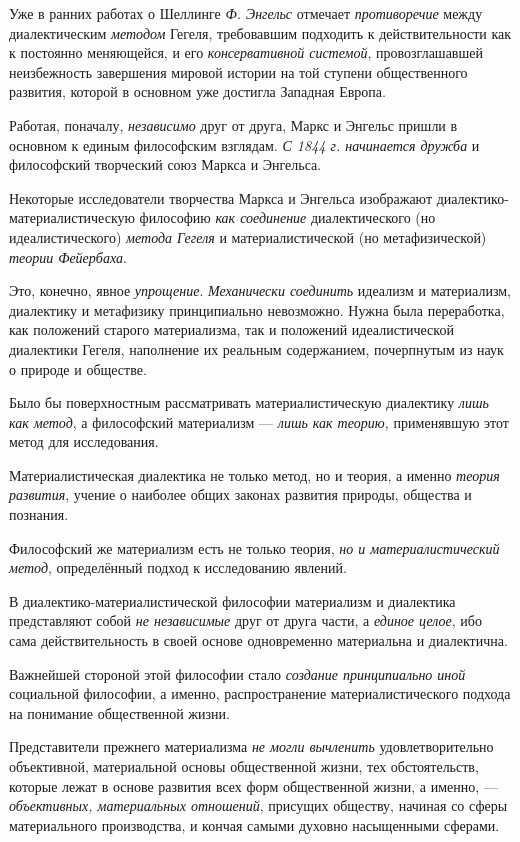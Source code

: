 \documentclass[a4paper,14pt,russian]{extreport}
\begin{document}
Уже в ранних работах о Шеллинге \emph{Ф. Энгельс} отмечает \emph{противоречие} между диалектическим \emph{методом} Гегеля, требовавшим подходить к действительности как к постоянно меняющейся, и его \emph{консервативной системой}, провозглашавшей неизбежность завершения мировой истории на той ступени общественного развития, которой в основном уже достигла Западная Европа.

Работая, поначалу, \emph{независимо} друг от друга, Маркс и Энгельс пришли в основном к единым философским взглядам. \emph{С 1844 г. начинается дружба} и философский творческий союз Маркса и Энгельса.

Некоторые исследователи творчества Маркса и Энгельса изображают диалектико-материалистическую философию \emph{как соединение} диалектического (но идеалистического) \emph{метода Гегеля} и материалистической (но метафизической) \emph{теории Фейербаха}.

Это, конечно, явное \emph{упрощение}. \emph{Механически соединить} идеализм и материализм, диалектику и метафизику принципиально невозможно. Нужна была переработка, как положений старого материализма, так и положений идеалистической диалектики Гегеля, наполнение их реальным содержанием, почерпнутым из наук о природе и обществе.

Было бы поверхностным рассматривать материалистическую диалектику \emph{лишь как метод}, а философский материализм --- \emph{лишь как теорию,} применявшую этот метод для исследования.

Материалистическая диалектика не только метод, но и теория, а именно \emph{теория развития}, учение о наиболее общих законах развития природы, общества и познания.

Философский же материализм есть не только теория, \emph{но и материалистический метод}, определённый подход к исследованию явлений.

В диалектико-материалистической философии материализм и диалектика представляют собой \emph{не независимые} друг от друга части, а \emph{единое целое}, ибо сама действительность в своей основе одновременно материальна и диалектична.

Важнейшей стороной этой философии стало \emph{создание принципиально иной} социальной философии, а именно, распространение материалистического подхода на понимание общественной жизни.

Представители прежнего материализма \emph{не могли вычленить} удовлетворительно объективной, материальной основы общественной жизни, тех обстоятельств, которые лежат в основе развития всех форм общественной жизни, а именно, --- \emph{объективных, материальных отношений}, присущих обществу, начиная со сферы материального производства, и кончая самыми духовно насыщенными сферами.
\end{document}
